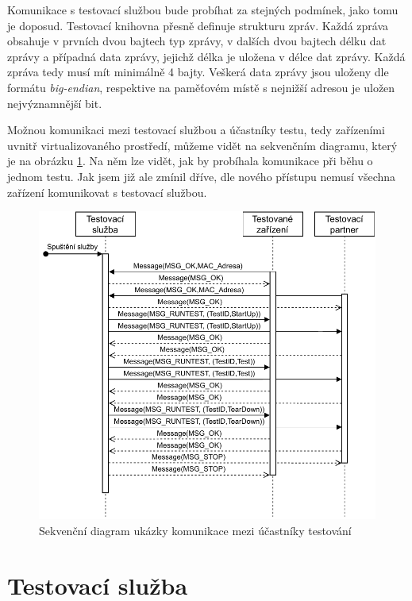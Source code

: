 Komunikace s testovací službou bude probíhat za stejných podmínek, jako tomu je doposud. Testovací knihovna přesně definuje strukturu zpráv. Každá zpráva obsahuje v prvních dvou bajtech typ zprávy, v dalších dvou bajtech délku dat zprávy a případná data zprávy, jejichž délka je uložena v délce dat zprávy. Každá zpráva tedy musí mít minimálně 4 bajty. Veškerá data zprávy jsou uloženy dle formátu \textit{big-endian}, respektive na paměťovém místě s nejnižší adresou je uložen nejvýznamnější bit.

Možnou komunikaci mezi testovací službou a účastníky testu, tedy zařízeními uvnitř virtualizovaného prostředí, můžeme vidět na sekvenčním diagramu, který je na obrázku \ref{fig:seqdiag}. Na něm lze vidět, jak by probíhala komunikace při běhu o jednom testu. Jak jsem již ale zmínil dříve, dle nového přístupu nemusí všechna zařízení komunikovat s testovací službou. 

\begin{figure}[htbp]
    \centering 
    \includegraphics[width=\textwidth]{assets/img/bp_assets/sequencediagram.pdf}
    \caption{Sekvenční diagram ukázky komunikace mezi účastníky testování}
    \label{fig:seqdiag}
\end{figure}

\section{Testovací služba}


